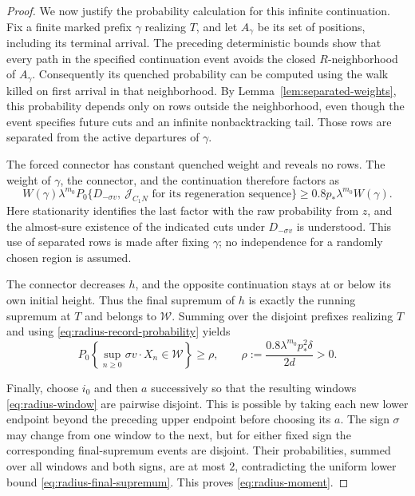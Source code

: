 \begin{proof}
We now justify the probability calculation for this infinite
continuation.  Fix a finite marked prefix $\gamma$ realizing $T$, and
let $A_\gamma$ be its set of positions, including its terminal arrival.
The preceding deterministic bounds show that every path in the
specified continuation event avoids the closed $R$-neighborhood of
$A_\gamma$.  Consequently its quenched probability can be computed
using the walk killed on first arrival in that neighborhood.  By
Lemma~\ref{lem:separated-weights}, this probability depends only on
rows outside the neighborhood, even though the event specifies future
cuts and an infinite nonbacktracking tail.  Those rows are separated
from the active departures of $\gamma$.

The forced connector has constant quenched weight and reveals no rows.
The weight of $\gamma$, the connector, and the continuation therefore
factors as
\[
  W(\gamma)\lambda^{m_0}
  P_0\{D_{-\sigma v},\ \mathcal J_{C_1N}
                 \text{ for its regeneration sequence}\}
  \ge 0.8p_*\lambda^{m_0}W(\gamma).
\]
Here stationarity identifies the last factor with the raw probability
from $z$, and the almost-sure existence of the indicated cuts under
$D_{-\sigma v}$ is understood.  This use of separated rows is made
after fixing $\gamma$; no independence for a randomly chosen region is
assumed.

The connector decreases $h$, and the opposite continuation stays at
or below its own initial height.  Thus the final supremum of $h$ is
exactly the running supremum at $T$ and belongs to $\mathcal W$.
Summing over the disjoint prefixes realizing $T$ and using
\eqref{eq:radius-record-probability} yields
\begin{equation}
  P_0\left\{\sup_{n\ge0}\sigma v\cdot X_n\in\mathcal W\right\}
  \ge\rho,
  \qquad
  \rho:=\frac{0.8\lambda^{m_0}p_*^2\delta}{2d}>0.
  \label{eq:radius-final-supremum}
\end{equation}

Finally, choose $i_0$ and then $a$ successively so that the resulting
windows \eqref{eq:radius-window} are pairwise disjoint.  This is
possible by taking each new lower endpoint beyond the preceding upper
endpoint before choosing its $a$.  The sign $\sigma$ may change from
one window to the next, but for either fixed sign the corresponding
final-supremum events are disjoint.  Their probabilities, summed over
all windows and both signs, are at most $2$, contradicting the uniform
lower bound \eqref{eq:radius-final-supremum}.  This proves
\eqref{eq:radius-moment}.
\end{proof}

